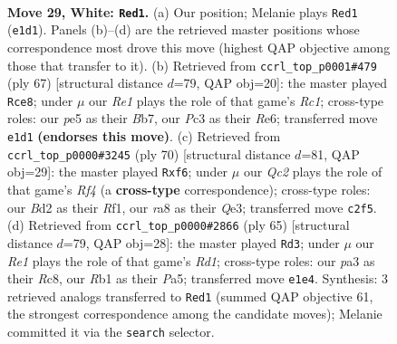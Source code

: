 \documentclass[11pt]{article}
\begin{document}
\clearpage

\begin{figure}[p]\centering
\begin{subfigure}{0.46\textwidth}\centering
\resizebox{\linewidth}{!}{%
\newchessgame
\chessboard[
  setfen={r1bq2k1/8/8/4pr1p/2p4P/p1P3P1/P1QB4/1R2R1K1 w - - 0 29},
  showmover=false,
  pgfstyle=straightmove, color=movearrow, markmove={e1-d1}
]}
\caption{}
\end{subfigure}\hfill
\begin{subfigure}{0.46\textwidth}\centering
\resizebox{\linewidth}{!}{%
\newchessgame
\chessboard[
  setfen={2r4k/1b5P/4rp1R/1p1q2p1/p2P4/B1P2PQ1/6P1/R5K1 b - - 4 34},
  showmover=false,
  pgfstyle=straightmove, color=movearrow, markmove={c8-e8}
]}
\caption{}
\end{subfigure}
\\[4pt]
\begin{subfigure}{0.46\textwidth}\centering
\resizebox{\linewidth}{!}{%
\newchessgame
\chessboard[
  setfen={7r/2r3k1/3p1bp1/1q1P3p/p3PR2/4Q2P/KP4P1/5R2 w - - 0 36},
  showmover=false,
  pgfstyle=straightmove, color=movearrow, markmove={f4-f6}
]}
\caption{}
\end{subfigure}\hfill
\begin{subfigure}{0.46\textwidth}\centering
\resizebox{\linewidth}{!}{%
\newchessgame
\chessboard[
  setfen={2rr3k/2q2p1P/4p1p1/p1n1P2P/2P2P2/4Q2R/6BK/1R6 b - - 0 33},
  showmover=false,
  pgfstyle=straightmove, color=movearrow, markmove={d8-d3}
]}
\caption{}
\end{subfigure}
\caption{\textbf{Move 29, White: \texttt{Red1}.} (a) Our position; Melanie plays \texttt{Red1} (\texttt{e1d1}). Panels (b)--(d) are the retrieved master positions whose correspondence most drove this move (highest QAP objective among those that transfer to it). (b) Retrieved from \texttt{ccrl\_top\_p0001\#479} (ply 67) [structural distance $d$=79, QAP obj=20]: the master played \texttt{Rce8}; under $\mu$ our \emph{Re1} plays the role of that game's \emph{Rc1}; cross-type roles: our \emph{p}e5 as their \emph{B}b7, our \emph{P}c3 as their \emph{R}e6; transferred move \texttt{e1d1} \textbf{(endorses this move)}. (c) Retrieved from \texttt{ccrl\_top\_p0000\#3245} (ply 70) [structural distance $d$=81, QAP obj=29]: the master played \texttt{Rxf6}; under $\mu$ our \emph{Qc2} plays the role of that game's \emph{Rf4} (a \textbf{cross-type} correspondence); cross-type roles: our \emph{B}d2 as their \emph{R}f1, our \emph{r}a8 as their \emph{Q}e3; transferred move \texttt{c2f5}. (d) Retrieved from \texttt{ccrl\_top\_p0000\#2866} (ply 65) [structural distance $d$=79, QAP obj=28]: the master played \texttt{Rd3}; under $\mu$ our \emph{Re1} plays the role of that game's \emph{Rd1}; cross-type roles: our \emph{p}a3 as their \emph{R}c8, our \emph{R}b1 as their \emph{P}a5; transferred move \texttt{e1e4}. Synthesis: 3 retrieved analogs transferred to \texttt{Red1} (summed QAP objective 61, the strongest correspondence among the candidate moves); Melanie committed it via the \texttt{search} selector.}
\label{fig:thought-m56}
\end{figure}
\end{document}
